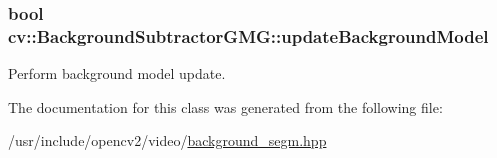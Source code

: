 \hypertarget{classcv_1_1BackgroundSubtractorGMG_a8095e2a8182e87e02afdc4c3d30959d1}{
\subsubsection[{update\-Background\-Model}]{\setlength{\rightskip}{0pt plus 5cm}bool cv\-::\-Background\-Subtractor\-G\-M\-G\-::update\-Background\-Model}}\label{classcv_1_1BackgroundSubtractorGMG_a8095e2a8182e87e02afdc4c3d30959d1}


Perform background model update. 



The documentation for this class was generated from the following file\-:\begin{DoxyCompactItemize}
\item 
/usr/include/opencv2/video/\hyperlink{background__segm_8hpp}{background\-\_\-segm.\-hpp}\end{DoxyCompactItemize}
